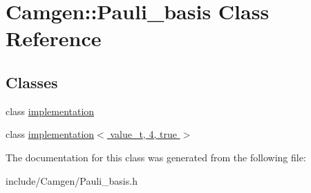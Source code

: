 \hypertarget{a00409}{\section{Camgen\-:\-:Pauli\-\_\-basis Class Reference}
\label{a00409}
}
\subsection*{Classes}
\begin{DoxyCompactItemize}
\item 
class \hyperlink{a00293}{implementation}
\item 
class \hyperlink{a00303}{implementation$<$ value\-\_\-t, 4, true $>$}
\end{DoxyCompactItemize}


The documentation for this class was generated from the following file\-:\begin{DoxyCompactItemize}
\item 
include/\-Camgen/Pauli\-\_\-basis.\-h\end{DoxyCompactItemize}
